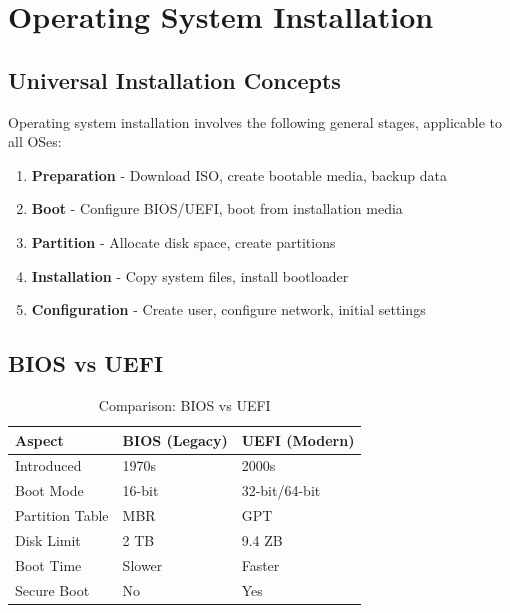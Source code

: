 
\section{Operating System Installation}
\label{sec:os-installation}

\subsection{Universal Installation Concepts}

Operating system installation involves the following general stages, applicable to all OSes:

\begin{enumerate}
    \item \textbf{Preparation} - Download ISO, create bootable media, backup data
    \item \textbf{Boot} - Configure BIOS/UEFI, boot from installation media
    \item \textbf{Partition} - Allocate disk space, create partitions
    \item \textbf{Installation} - Copy system files, install bootloader
    \item \textbf{Configuration} - Create user, configure network, initial settings
\end{enumerate}

\subsection{BIOS vs UEFI}

\begin{table}[htbp]
    \centering
    \caption{Comparison: BIOS vs UEFI}
    \label{tab:bios-uefi}
    \begin{tabular}{@{}lll@{}}
        \toprule
        \textbf{Aspect} & \textbf{BIOS (Legacy)} & \textbf{UEFI (Modern)} \\
        \midrule
        Introduced & 1970s & 2000s \\
        Boot Mode & 16-bit & 32-bit/64-bit \\
        Partition Table & MBR & GPT \\
        Disk Limit & 2 TB & 9.4 ZB \\
        Boot Time & Slower & Faster \\
        Secure Boot & No & Yes \\
        \bottomrule
    \end{tabular}
\end{table}

